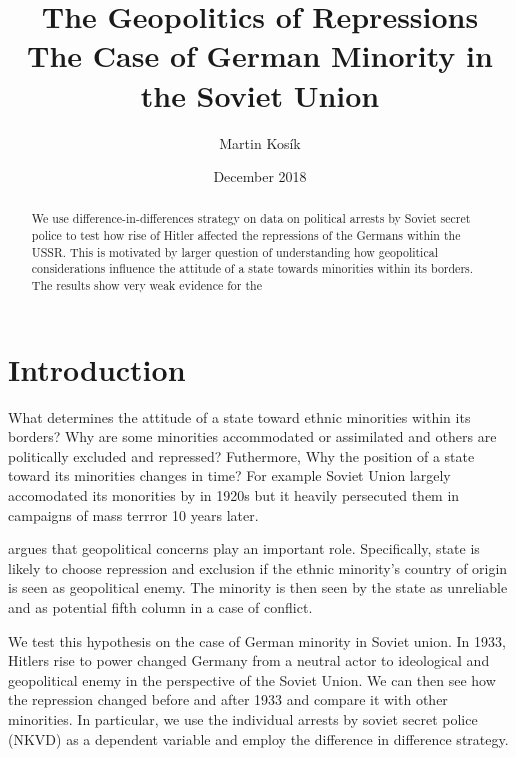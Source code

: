 \documentclass[11pt]{article}
\title{The Geopolitics of Repressions \\
  \large The Case of German Minority in the Soviet Union}
\author{Martin Kosík}
\date{December 2018}
\begin{document}
\maketitle

\begin{abstract}
    We use difference-in-differences strategy on data on political arrests by Soviet secret police to test how rise of Hitler affected the repressions of the Germans within the USSR. This is motivated by larger question of understanding how geopolitical considerations influence the attitude of a state towards minorities within its borders. The results show very weak evidence for the
\end{abstract}

\section{Introduction}
What determines the attitude of a state toward ethnic minorities within its borders? Why are some minorities accommodated or assimilated and others are politically excluded and repressed? Futhermore,  Why the position of a state toward its minorities changes in time? For example Soviet Union largely accomodated its monorities by in 1920s but it heavily persecuted them in campaigns of mass terrror 10 years later. 

\citet{mylonas_politics_2013} argues that geopolitical concerns play an important role. Specifically, state is likely to choose repression and exclusion if the ethnic minority's country of origin is seen as geopolitical enemy. The minority is then seen by the state as unreliable and  as potential fifth column in a case of conflict.  

We test this hypothesis on the case of German minority in Soviet union.
In 1933, Hitlers rise to power changed Germany from a neutral actor to ideological and geopolitical enemy in the perspective of the Soviet Union. We can then see how the repression changed before and after 1933 and compare it with other minorities. In particular, we use the individual arrests by soviet secret police (NKVD) as a dependent variable and employ the difference in difference strategy. 
\end{document}
